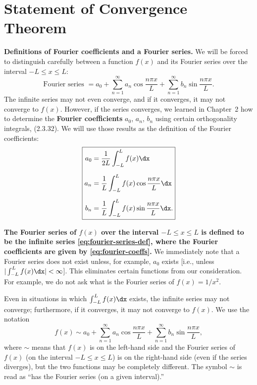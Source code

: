 \section{Statement of Convergence Theorem}
\label{sec:convergence-theorem}

\textbf{Definitions of Fourier coefficients and a Fourier series.}  We will be forced to distinguish carefully between a function $f(x)$ and its Fourier series over the interval $-L \le x \le L$:
\begin{equation}
\label{eq:fourier-series-def}
\text{Fourier series } = a_0 + \sum_{n=1}^{\infty} a_n \cos \frac{n\pi x}{L} + \sum_{n=1}^{\infty} b_n \sin \frac{n\pi x}{L}.
\end{equation}
The infinite series may not even converge, and if it converges, it may not converge to $f(x)$.  However, if the series converges, we learned in Chapter~2 how to determine the \textbf{Fourier coefficients} $a_0$, $a_n$, $b_n$ using certain orthogonality integrals, (2.3.32).  We will use those results as the definition of the Fourier coefficients:
\begin{equation}
\label{eq:fourier-coeffs}
\boxed{
\begin{aligned}
a_0 &= \frac{1}{2L} \int_{-L}^{L} f(x) \dx \\[6pt]
a_n &= \frac{1}{L} \int_{-L}^{L} f(x) \cos \frac{n\pi x}{L} \dx \\[6pt]
b_n &= \frac{1}{L} \int_{-L}^{L} f(x) \sin \frac{n\pi x}{L} \dx.
\end{aligned}
}
\end{equation}

\textbf{The Fourier series of $f(x)$ over the interval $-L \le x \le L$ is defined to be the infinite series \eqref{eq:fourier-series-def}, where the Fourier coefficients are given by \eqref{eq:fourier-coeffs}.}  We immediately note that a Fourier series does not exist unless, for example, $a_0$ exists [i.e., unless $|\int_{-L}^{L} f(x) \dx| < \infty$].  This eliminates certain functions from our consideration.  For example, we do not ask what is the Fourier series of $f(x) = 1/x^2$.

Even in situations in which $\int_{-L}^{L} f(x) \dx$ exists, the infinite series may not converge; furthermore, if it converges, it may not converge to $f(x)$.  We use the notation
\begin{equation}
\label{eq:fourier-tilde}
f(x) \sim a_0 + \sum_{n=1}^{\infty} a_n \cos \frac{n\pi x}{L} + \sum_{n=1}^{\infty} b_n \sin \frac{n\pi x}{L},
\end{equation}
where $\sim$ means that $f(x)$ is on the left-hand side and the Fourier series of $f(x)$ (on the interval $-L \le x \le L$) is on the right-hand side (even if the series diverges), but the two functions may be completely different.  The symbol $\sim$ is read as ``has the Fourier series (on a given interval).''

